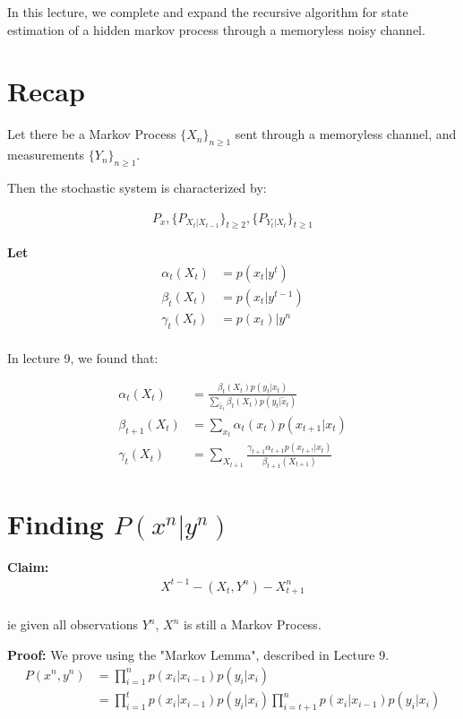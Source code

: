 \documentclass{article}
\begin{document}
In this lecture, we complete and expand the recursive algorithm for state estimation of a hidden markov process through a memoryless noisy channel. 




\section{Recap}

Let there be a Markov Process $\{X_n\}_{n \geq 1}$ sent through a memoryless channel, and measurements $\{Y_n\}_{n \geq 1}$.

Then the stochastic system is characterized by:

\begin{align*}
P_x, \{P_{X_t | X_{t-1}}\}_{t \geq 2}, \{P_{Y_t | X_t}\}_{t \geq 1}
\end{align*}

\textbf{Let}
\begin{align*}
\alpha_t(X_t) &= p(x_t | y^t)\\
\beta_t(X_t) &= p(x_t | y^{t-1})\\
\gamma_t(X_t) &= p(x_t) | y^n\\
\end{align*}

In lecture 9, we found that:

\begin{align*}
\alpha_t(X_t) &= \frac{\beta_t(X_t)p(y_t | x_t)}{\sum_{\tilde{x}_t}^{}\beta_t(X_t)p(y_t | \tilde{x}_t)}\\
\beta_{t+1}(X_t) &= \sum_{x_t}^{}\alpha_t(x_t)p(x_{t+1} | x_t)\\
\gamma_t(X_t) &= \sum_{X_{t+1}}^{}\frac{\gamma_{t+1}\alpha_{t+1}p(x_{t+!} | x_t)}{\beta_{t+1}(X_{t+1})}
\end{align*}

\section{Finding $ P(x^n | y^n) $}
\textbf{Claim:} 
\begin{align*}
X^{t-1} - (X_t, Y^n) - X^{n}_{t+1}\\
\end{align*}

ie given all observations $Y^n$, $X^n$ is still a Markov Process.

\textbf{Proof:}  We prove using the "Markov Lemma", described in Lecture 9.
\begin{align*}
P(x^n,y^n) &= \prod_{i=1}^{n}p(x_i | x_{i-1})p(y_i | x_i)\\
&= \prod_{i=1}^{t}p(x_i | x_{i-1})p(y_i | x_i) \prod_{i = t+1}^{n}p(x_i | x_{i-1})p(y_i | x_i)\\
\end{align*}
\end{document}
